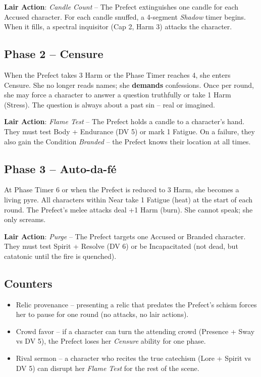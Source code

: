 \noindent\textbf{Lair Action}: \emph{Candle Count} -- The Prefect extinguishes one candle for each Accused character. For each candle snuffed, a 4-segment \emph{Shadow} timer begins. When it fills, a spectral inquisitor (Cap 2, Harm 3) attacks the character.

\subsection*{Phase 2 -- Censure}

\noindent When the Prefect takes 3 Harm or the Phase Timer reaches 4, she enters Censure. She no longer reads names; she \textbf{demands} confessions. Once per round, she may force a character to answer a question truthfully or take 1 Harm (Stress). The question is always about a past sin -- real or imagined.

\noindent\textbf{Lair Action}: \emph{Flame Test} -- The Prefect holds a candle to a character's hand. They must test Body + Endurance (DV 5) or mark 1 Fatigue. On a failure, they also gain the Condition \emph{Branded} -- the Prefect knows their location at all times.

\subsection*{Phase 3 -- Auto-da-fé}

\noindent At Phase Timer 6 or when the Prefect is reduced to 3 Harm, she becomes a living pyre. All characters within Near take 1 Fatigue (heat) at the start of each round. The Prefect's melee attacks deal +1 Harm (burn). She cannot speak; she only screams.

\noindent\textbf{Lair Action}: \emph{Purge} -- The Prefect targets one Accused or Branded character. They must test Spirit + Resolve (DV 6) or be Incapacitated (not dead, but catatonic until the fire is quenched).

\subsection*{Counters}

\begin{itemize}
    \item Relic provenance -- presenting a relic that predates the Prefect's schism forces her to pause for one round (no attacks, no lair actions).
    \item Crowd favor -- if a character can turn the attending crowd (Presence + Sway vs DV 5), the Prefect loses her \emph{Censure} ability for one phase.
    \item Rival sermon -- a character who recites the true catechism (Lore + Spirit vs DV 5) can disrupt her \emph{Flame Test} for the rest of the scene.
\end{itemize}

